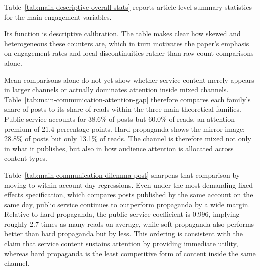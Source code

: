 \documentclass[12pt, american]{article}
\begin{document}
\begin{refsection}


Table~\ref{tab:main-descriptive-overall-stats} reports article-level summary statistics for the main engagement variables.

Its function is descriptive calibration. The table makes clear how skewed and heterogeneous these counters are, which in turn motivates the paper's emphasis on engagement rates and local discontinuities rather than raw count comparisons alone.



Mean comparisons alone do not yet show whether service content merely appears in larger channels or actually dominates attention inside mixed channels. Table~\ref{tab:main-communication-attention-gap} therefore compares each family's share of posts to its share of reads within the three main theoretical families. Public service accounts for 38.6\% of posts but 60.0\% of reads, an attention premium of 21.4 percentage points. Hard propaganda shows the mirror image: 28.8\% of posts but only 13.1\% of reads. The channel is therefore mixed not only in what it publishes, but also in how audience attention is allocated across content types.



Table~\ref{tab:main-communication-dilemma-post} sharpens that comparison by moving to within-account-day regressions. Even under the most demanding fixed-effects specification, which compares posts published by the same account on the same day, public service continues to outperform propaganda by a wide margin. Relative to hard propaganda, the public-service coefficient is 0.996, implying roughly 2.7 times as many reads on average, while soft propaganda also performs better than hard propaganda but by less. This ordering is consistent with the claim that service content sustains attention by providing immediate utility, whereas hard propaganda is the least competitive form of content inside the same channel.




\end{refsection}
\end{document}
